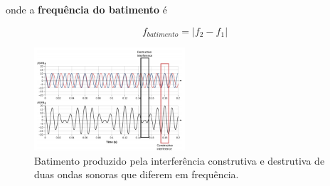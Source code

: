 onde a \textbf{frequência do batimento} é

\begin{equation}
    f_{batimento}=|f_2-f_1|
\end{equation}

\begin{figure}[h!]
    \centering
    \includegraphics[width=0.5\textwidth]{12/fig/batimento.png}
    \caption{Batimento produzido pela interferência construtiva e destrutiva de duas ondas sonoras que diferem em frequência.}
\end{figure}
